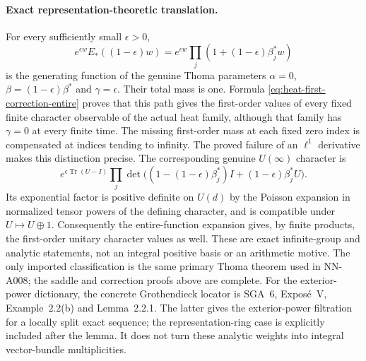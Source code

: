 \paragraph{Exact representation-theoretic translation.}
For every sufficiently small $\epsilon>0$,
\[
 e^{\epsilon w}E_*((1-\epsilon)w)
 =e^{\epsilon w}\prod_j(1+(1-\epsilon)\beta_j^*w)
\]
is the generating function of the genuine Thoma parameters
$\alpha=0$, $\beta=(1-\epsilon)\beta^*$ and $\gamma=\epsilon$.
Their total mass is one. Formula
\eqref{eq:heat-first-correction-entire} proves that this path gives
the first-order values of every fixed finite character observable
of the actual heat family, although that family has $\gamma=0$
at every finite time. The missing first-order mass at each fixed
zero index is compensated at indices tending to infinity.
The proved failure of an $\ell^1$ derivative makes this distinction
precise. The corresponding genuine $U(\infty)$ character is
\[
 e^{\epsilon\operatorname{Tr}(U-I)}
 \prod_j\det\bigl((1-(1-\epsilon)\beta_j^*)I
                         +(1-\epsilon)\beta_j^*U\bigr).
\]
Its exponential factor is positive definite on $U(d)$ by the
Poisson expansion in normalized tensor powers of the defining
character, and is compatible under $U\mapsto U\oplus1$.
Consequently the entire-function expansion gives, by finite
products, the first-order unitary character values as well.
These are exact infinite-group and analytic statements, not an
integral positive basis or an arithmetic motive. The only imported
classification is the same primary Thoma theorem used in NN-A008;
the saddle and correction proofs above are complete.
For the exterior-power dictionary, the concrete Grothendieck
locator is SGA~6, Expos\'e~V, Example~2.2(b) and Lemma~2.2.1.
The latter gives the exterior-power filtration for a locally
split exact sequence; the representation-ring case is explicitly
included after the lemma. It does not turn these analytic weights
into integral vector-bundle multiplicities.
